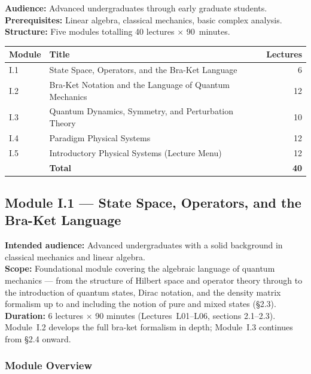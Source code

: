 \documentclass[11pt,a4paper]{article}
\newcommand{\coursebadge}[1]{%
  \begin{tcolorbox}[highlightbox]#1\end{tcolorbox}%
}
\begin{document}
\begin{tcolorbox}[seriesbox, title={Series~I Overview}]
\textbf{Audience:} Advanced undergraduates through early graduate students.\\
\textbf{Prerequisites:} Linear algebra, classical mechanics, basic complex analysis.\\
\textbf{Structure:} Five modules totalling 40 lectures $\times$ 90~minutes.\\[4pt]
\begin{tabular}{llr}
\toprule
\textbf{Module} & \textbf{Title} & \textbf{Lectures}\\
\midrule
I.1 & State Space, Operators, and the Bra-Ket Language & 6\\
I.2 & Bra-Ket Notation and the Language of Quantum Mechanics & 12\\
I.3 & Quantum Dynamics, Symmetry, and Perturbation Theory & 10\\
I.4 & Paradigm Physical Systems & 12\\
I.5 & Introductory Physical Systems (Lecture Menu) & 12\\
\midrule
 & \textbf{Total} & \textbf{40}\\
\bottomrule
\end{tabular}
\end{tcolorbox}

\subsection{Module I.1 --- State Space, Operators, and the Bra-Ket Language}
\label{sec:mod-I1}

\coursebadge{%
  \textbf{Intended audience:} Advanced undergraduates with a solid background in
  classical mechanics and linear algebra.\\[2pt]
  \textbf{Scope:} Foundational module covering the algebraic language of quantum
  mechanics --- from the structure of Hilbert space and operator theory through
  to the introduction of quantum states, Dirac notation, and the density matrix
  formalism up to and including the notion of pure and mixed states (\S2.3).\\[2pt]
  \textbf{Duration:} 6 lectures $\times$ 90 minutes (Lectures~L01--L06,
  sections 2.1--2.3). Module~I.2 develops the full bra-ket formalism in
  depth; Module~I.3 continues from \S2.4 onward.
}

\subsubsection*{Module Overview}
\end{document}
